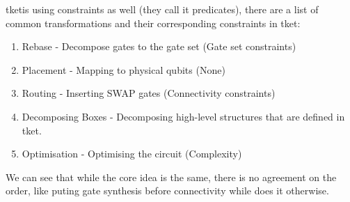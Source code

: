 \documentclass{report}
\begin{document}
tket\texttrademark is using constraints as well (they call it predicates), there are a list of common transformations and their corresponding constraints in tket:

\begin{enumerate}
  \item Rebase - Decompose gates to the gate set (Gate set constraints)
  \item Placement - Mapping to physical qubits (None)
  \item Routing - Inserting SWAP gates (Connectivity constraints)
  \item Decomposing Boxes - Decomposing high-level structures that are defined in tket.
  \item Optimisation - Optimising the circuit (Complexity)
\end{enumerate}

We can see that while the core idea is the same, there is no agreement on the order, like \cite{wille2020,sivarajah2021} puting gate synthesis before connectivity while \cite{qiskit2023} does it otherwise.
\end{document}

